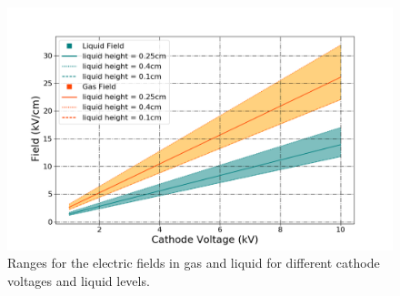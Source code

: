 \begin{figure}[htbp]
\begin{center}
\includegraphics[width=\textwidth]{figures/testbed/fields_in_xaber.png}
\caption{Ranges for the electric fields in gas and liquid for different cathode voltages and liquid levels.}
\label{fig:fields_in_liquid_and_gas}
\end{center}
\end{figure}


